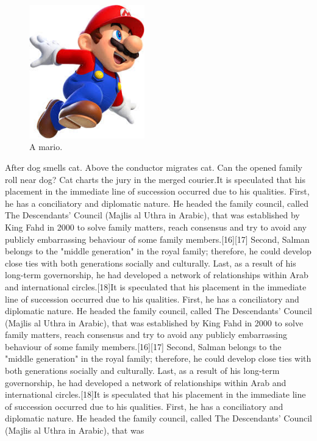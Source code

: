 \documentclass[12pt]{article}
\begin{document}
\begin{figure}
\centering
  \includegraphics[width=5cm]{mario.png}
  \caption{A mario.}
  \label{fig:a mario}
  \end{figure}
  
  
After dog smells cat. Above the conductor migrates cat. Can the opened family roll near dog? Cat charts the jury in the merged courier.It is speculated that his placement in the immediate line of succession occurred due to his qualities. First, he has a conciliatory and diplomatic nature. He headed the family council, called The Descendants' Council (Majlis al Uthra in Arabic), that was established by King Fahd in 2000 to solve family matters, reach consensus and try to avoid any publicly embarrassing behaviour of some family members.[16][17] Second, Salman belongs to the "middle generation" in the royal family; therefore, he could develop close ties with both generations socially and culturally. Last, as a result of his long-term governorship, he had developed a network of relationships within Arab and international circles.[18]It is speculated that his placement in the immediate line of succession occurred due to his qualities. First, he has a conciliatory and diplomatic nature. He headed the family council, called The Descendants' Council (Majlis al Uthra in Arabic), that was established by King Fahd in 2000 to solve family matters, reach consensus and try to avoid any publicly embarrassing behaviour of some family members.[16][17] Second, Salman belongs to the "middle generation" in the royal family; therefore, he could develop close ties with both generations socially and culturally. Last, as a result of his long-term governorship, he had developed a network of relationships within Arab and international circles.[18]It is speculated that his placement in the immediate line of succession occurred due to his qualities. First, he has a conciliatory and diplomatic nature. He headed the family council, called The Descendants' Council (Majlis al Uthra in Arabic), that was\\\\
\end{document}
